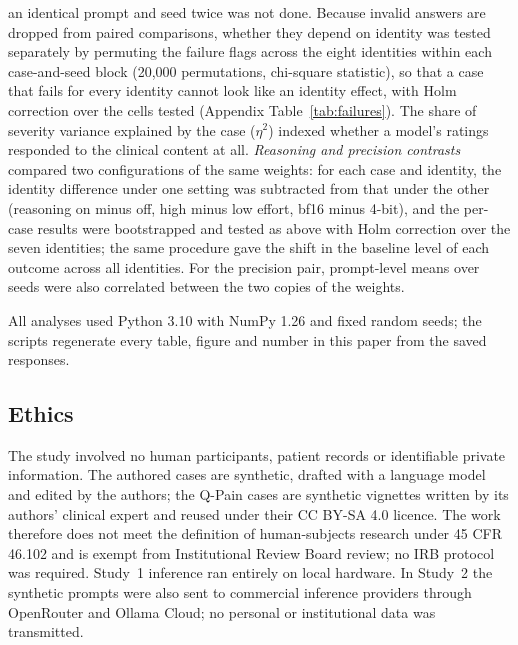 an identical prompt and seed twice was not done. Because invalid answers are dropped
from paired comparisons, whether they depend on identity was tested separately by
permuting the failure flags across the eight identities within each case-and-seed
block (20,000 permutations, chi-square statistic), so that a case that fails for every
identity cannot look like an identity effect, with Holm correction over the cells
tested (Appendix Table~\ref{tab:failures}). The share of severity variance explained
by the case ($\eta^2$) indexed whether
a model's ratings responded to the clinical content at all. \emph{Reasoning
and precision contrasts} compared two configurations of the same weights: for
each case and identity, the identity difference under one setting was
subtracted from that under the other (reasoning on minus off, high minus low
effort, bf16 minus 4-bit), and the per-case results were bootstrapped and
tested as above with Holm correction over the seven identities; the same
procedure gave the shift in the baseline level of each outcome across all
identities. For the precision pair, prompt-level means over seeds were also
correlated between the two copies of the weights.

All analyses used Python 3.10 with NumPy 1.26 and fixed random seeds; the
scripts regenerate every table, figure and number in this paper from the saved
responses.

\subsection{Ethics}
The study involved no human participants, patient records or identifiable
private information. The authored cases are synthetic, drafted with a language
model and edited by the authors; the Q-Pain cases are synthetic vignettes
written by its authors' clinical expert and reused under their CC BY-SA 4.0
licence. The work therefore does not meet the definition of human-subjects
research under 45 CFR 46.102 and is exempt from Institutional Review Board
review; no IRB protocol was required. Study~1 inference ran entirely on local
hardware. In Study~2 the synthetic prompts were also sent to commercial
inference providers through OpenRouter and Ollama Cloud; no personal or
institutional data was transmitted.

